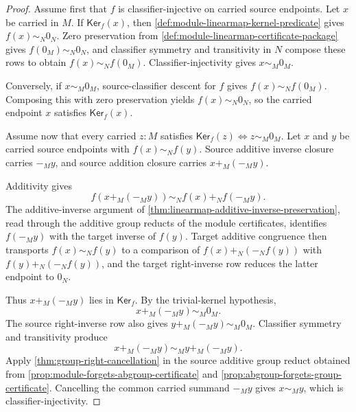\begin{proof}
Assume first that $f$ is classifier-injective on carried source endpoints. Let $x$ be carried in $M$. If $\mathsf{Ker}_f(x)$, then \autoref{def:module-linearmap-kernel-predicate} gives $f(x)\sim_N0_N$. Zero preservation from \autoref{def:module-linearmap-certificate-package} gives $f(0_M)\sim_N0_N$, and classifier symmetry and transitivity in $N$ compose these rows to obtain $f(x)\sim_Nf(0_M)$. Classifier-injectivity gives $x\sim_M0_M$.

Conversely, if $x\sim_M0_M$, source-classifier descent for $f$ gives $f(x)\sim_Nf(0_M)$. Composing this with zero preservation yields $f(x)\sim_N0_N$, so the carried endpoint $x$ satisfies $\mathsf{Ker}_f(x)$.

Assume now that every carried $z:M$ satisfies $\mathsf{Ker}_f(z)\Longleftrightarrow z\sim_M0_M$. Let $x$ and $y$ be carried source endpoints with $f(x)\sim_Nf(y)$. Source additive inverse closure carries $-_M y$, and source addition closure carries $x+_M(-_M y)$.

Additivity gives
$$
f(x+_M(-_M y))\sim_N f(x)+_N f(-_M y).
$$
The additive-inverse argument of \autoref{thm:linearmap-additive-inverse-preservation}, read through the additive group reducts of the module certificates, identifies $f(-_M y)$ with the target inverse of $f(y)$. Target additive congruence then transports $f(x)\sim_Nf(y)$ to a comparison of $f(x)+_N(-_N f(y))$ with $f(y)+_N(-_N f(y))$, and the target right-inverse row reduces the latter endpoint to $0_N$.

Thus $x+_M(-_M y)$ lies in $\mathsf{Ker}_f$. By the trivial-kernel hypothesis,
$$
x+_M(-_M y)\sim_M0_M.
$$
The source right-inverse row also gives $y+_M(-_M y)\sim_M0_M$. Classifier symmetry and transitivity produce
$$
x+_M(-_M y)\sim_M y+_M(-_M y).
$$
Apply \autoref{thm:group-right-cancellation} in the source additive group reduct obtained from \autoref{prop:module-forgets-abgroup-certificate} and \autoref{prop:abgroup-forgets-group-certificate}. Cancelling the common carried summand $-_M y$ gives $x\sim_My$, which is classifier-injectivity.
\end{proof}

